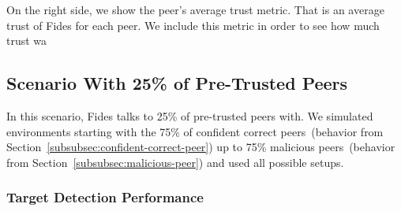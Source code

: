 On the right side, we show the peer's average trust metric. That is an average trust of Fides for each peer. We include this metric in order to see how much trust wa


\cleartoleftpage
\subsection{Scenario With 25\% of Pre-Trusted Peers}
\label{subsec:scenario-with-25-pretrusted-peers}

In this scenario, Fides talks to 25\% of pre-trusted peers with. We simulated environments starting with the 75\% of confident correct peers~(behavior from Section~\ref{subsubsec:confident-correct-peer}) up to 75\% malicious peers~(behavior from Section~\ref{subsubsec:malicious-peer}) and used all possible setups.

\subsubsection{Target Detection Performance}

